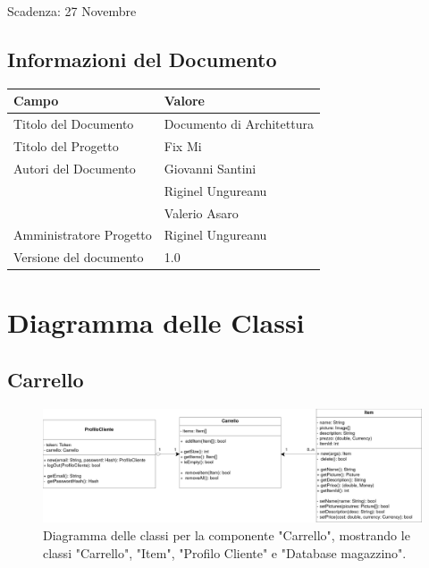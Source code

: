 \documentclass{report}
\begin{document}
	Scadenza: 27 Novembre
	
	
	
	\section{Informazioni del Documento}
	
	\begin{center} %
		\centering
		\begin{tabular}{ |p{4cm}|p{4cm}|  }
			\hline
			\centering Campo & \qquad\qquad Valore \\ %
			\hline
			Titolo del Documento & Documento di Architettura \\
			\hline
			Titolo del Progetto & Fix Mi \\
			\hline
			Autori del Documento &
			Giovanni Santini \\ & Riginel Ungureanu \\ & Valerio Asaro \\
			\hline
			Amministratore Progetto & Riginel Ungureanu\\
			\hline
			Versione del documento & 1.0 \\
			\hline
		\end{tabular}
	\end{center}
	
	
	
\chapter{Diagramma delle Classi}

\section{Carrello}
\begin{figure}[H]
	\centering\includegraphics[width=1\textwidth]{images/Diagramma_delle_classi_carrello.png}
	Diagramma delle classi per la componente "Carrello", mostrando le classi "Carrello", "Item", "Profilo Cliente" e "Database magazzino".
\end{figure}
\end{document}
